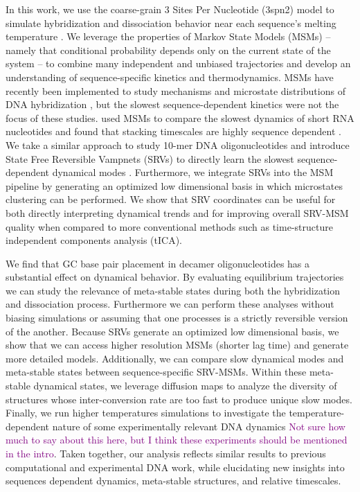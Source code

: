 \documentclass[journal=jpcbfk,manuscript=article]{achemso}
\begin{document}
In this work, we use the coarse-grain 3 Sites Per Nucleotide (3spn2) model to simulate hybridization and dissociation behavior near each sequence's melting temperature \citep{Hinckley2013AnHybridization}.  We leverage the properties of Markov State Models (MSMs) -- namely that conditional probability depends only on the current state of the system \citep{Pande2010EverythingAsk} -- to combine many independent and unbiased trajectories and develop an understanding of sequence-specific kinetics and thermodynamics. MSMs have recently been implemented to study mechanisms and microstate distributions of DNA hybridization  \citep{Jin2019, Xiao2019}, but the slowest sequence-dependent kinetics were not the focus of these studies. \citet{Pinamonti2017} used MSMs to compare the slowest dynamics of short RNA nucleotides and found that stacking timescales are highly sequence dependent \citep{Pinamonti2017}. We take a similar approach to study 10-mer DNA oligonucleotides and introduce State Free Reversible Vampnets (SRVs) to directly learn the slowest sequence-dependent dynamical modes \citep{Chen}. Furthermore, we integrate SRVs into the MSM pipeline by generating an optimized low dimensional basis in which microstates clustering can be performed. We show that SRV coordinates can be useful for both directly interpreting dynamical trends and for improving overall SRV-MSM quality when compared to more conventional methods such as time-structure independent components analysis (tICA).

We find that GC base pair placement in decamer oligonucleotides has a substantial effect on dynamical behavior. By evaluating equilibrium trajectories we can study the relevance of meta-stable states during both the hybridization and dissociation process. Furthermore we can perform these analyses without biasing simulations or assuming that one processes is a strictly reversible version of the another. Because SRVs generate an optimized low dimensional basis, we show that we can access higher resolution MSMs (shorter lag time) and generate more detailed models. Additionally, we can compare slow dynamical modes and meta-stable states between sequence-specific SRV-MSMs. Within these meta-stable dynamical states, we leverage diffusion maps to analyze the diversity of structures whose inter-conversion rate are too fast to produce unique slow modes. Finally, we run higher temperatures simulations to investigate the temperature-dependent nature of some experimentally relevant DNA dynamics \textcolor{purple}{Not sure how much to say about this here, but I think these experiments should be mentioned in the intro}. Taken together, our analysis reflects similar results to previous computational and experimental DNA work, while elucidating new insights into sequences dependent dynamics, meta-stable structures, and relative timescales. 
\end{document}
